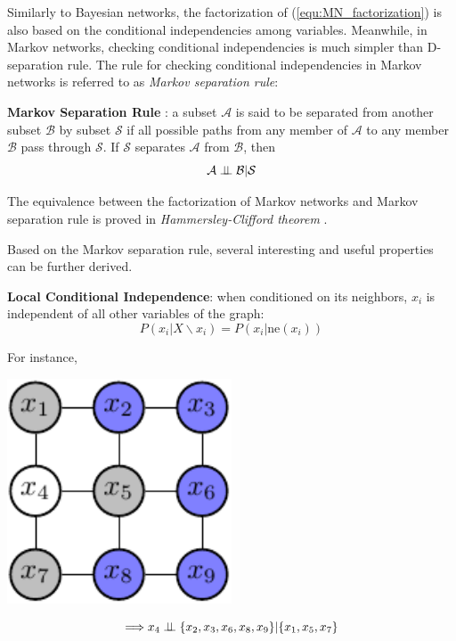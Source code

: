 Similarly to Bayesian networks, the factorization of (\ref{equ:MN_factorization}) is also based on the conditional independencies among variables.      
Meanwhile, in Markov networks, checking conditional independencies is much simpler than D-separation rule. The rule for checking  conditional independencies 
in Markov networks is referred to as \emph{Markov separation rule}:
\begin{theorem}
\textbf{Markov Separation Rule} : a subset $\mathcal{A}$ is said to be separated from another subset $\mathcal{B}$ 
by subset $\mathcal{S}$ if all possible paths from any member of $\mathcal{A}$ to any member $\mathcal{B}$
pass through $\mathcal{S}$. If $\mathcal{S}$ separates $\mathcal{A}$ from $\mathcal{B}$, then
 \begin{equation*}
 \mathcal{A} \perp\!\!\!\perp \mathcal{B} | \mathcal{S}
  \end{equation*}
\end{theorem}
The equivalence between the factorization of Markov networks and Markov separation rule is proved in \emph{Hammersley-Clifford theorem} \citep{HC_theorem}.  


Based on the Markov separation rule, several interesting and useful properties can be further derived.   
\begin{corollary}
\textbf{Local Conditional Independence}:
  when conditioned on its neighbors, $x_i$ is  independent of all other variables of the graph: 
   \begin{equation*}
    P(x_i|X \backslash x_i)= P(x_i|\text{ne}(x_i))
   \end{equation*}
\end{corollary}
For instance, \newline\newline 
\begin{minipage}[c]{0.5\textwidth}   
	\centering
	\includegraphics[width=0.5\textwidth]{./Figures/markov_net_1.pdf}
\end{minipage}
\begin{minipage}[c]{0.5\textwidth}
   \begin{equation*}
 \Longrightarrow x_4 \perp\!\!\!\perp \{x_2,x_3,x_6,x_8,x_9 \}|\{x_1,x_5,x_7\}
   \end{equation*}
\end{minipage}
\newline 

